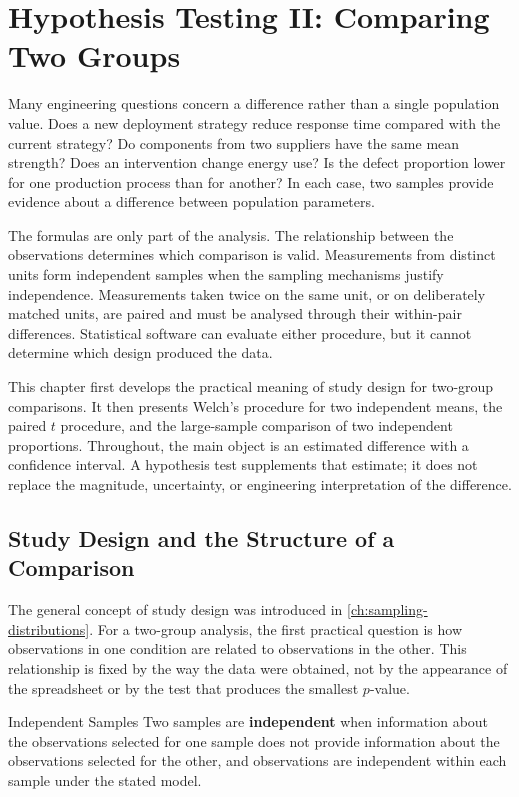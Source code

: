 \chapter{Hypothesis Testing II: Comparing Two Groups}
\label{ch:two-group-tests}

Many engineering questions concern a difference rather than a single population value. Does a new deployment strategy reduce response time compared with the current strategy? Do components from two suppliers have the same mean strength? Does an intervention change energy use? Is the defect proportion lower for one production process than for another? In each case, two samples provide evidence about a difference between population parameters.

The formulas are only part of the analysis. The relationship between the observations determines which comparison is valid. Measurements from distinct units form independent samples when the sampling mechanisms justify independence. Measurements taken twice on the same unit, or on deliberately matched units, are paired and must be analysed through their within-pair differences. Statistical software can evaluate either procedure, but it cannot determine which design produced the data.

This chapter first develops the practical meaning of study design for two-group comparisons. It then presents Welch's procedure for two independent means, the paired $t$ procedure, and the large-sample comparison of two independent proportions. Throughout, the main object is an estimated difference with a confidence interval. A hypothesis test supplements that estimate; it does not replace the magnitude, uncertainty, or engineering interpretation of the difference.

\section{Study Design and the Structure of a Comparison}
\label{sec:two-group-design}

The general concept of study design was introduced in \autoref{ch:sampling-distributions}. For a two-group analysis, the first practical question is how observations in one condition are related to observations in the other. This relationship is fixed by the way the data were obtained, not by the appearance of the spreadsheet or by the test that produces the smallest $p$-value.

\begin{definition}{Independent Samples}
Two samples are \textbf{independent} when information about the observations selected for one sample does not provide information about the observations selected for the other, and observations are independent within each sample under the stated model.
\end{definition}

